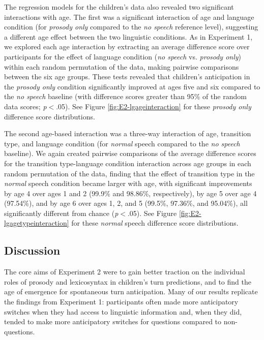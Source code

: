 \documentclass[authoryear, 12pt]{elsarticle}
\begin{document}
The regression models for the children's data also revealed two significant interactions with age. The first was a significant interaction of age and language condition (for \textit{prosody only} compared to the \textit{no speech} reference level), suggesting a different age effect between the two linguistic conditions. As in Experiment 1, we explored each age interaction by extracting an average difference score over participants for the effect of language condition (\textit{no speech} vs. \textit{prosody only}) within each random permutation of the data, making pairwise comparisons between the six age groups. These tests revealed that children's anticipation in the \textit{prosody only} condition significantly improved at ages five and six compared to the \textit{no speech} baseline (with difference scores greater than 95\% of the random data scores; \textit{p}$<$.05). See Figure \ref{fig:E2-lgageinteraction} for these \textit{prosody only} difference score distributions.

The second age-based interaction was a three-way interaction of age, transition type, and language condition (for \textit{normal} speech compared to the \textit{no speech} baseline). We again created pairwise comparisons of the average difference scores for the transition type-language condition interaction across age groups in each random permutation of the data, finding that the effect of transition type in the \textit{normal} speech condition became larger with age, with significant improvements by age 4 over ages 1 and 2 (99.9\% and 98.86\%, respectively), by age 5 over age 4 (97.54\%), and by age 6 over ages 1, 2, and 5 (99.5\%, 97.36\%, and 95.04\%), all significantly different from chance (\textit{p}$<$.05). See Figure \ref{fig:E2-lgagetypeinteraction} for these \textit{normal} speech difference score distributions.

\subsection*{Discussion}
\label{sec:discussion2}

The core aims of Experiment 2 were to gain better traction on the individual roles of prosody and lexicosyntax in children's turn predictions, and to find the age of emergence for spontaneous turn anticipation. Many of our results replicate the findings from Experiment 1: participants often made more anticipatory switches when they had access to linguistic information and, when they did, tended to make more anticipatory switches for questions compared to non-questions.
\end{document}
